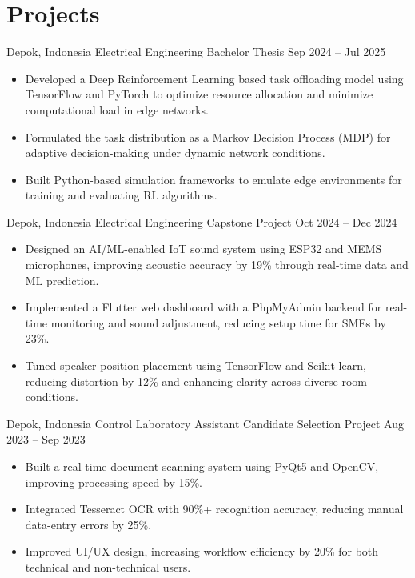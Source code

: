 \section*{Projects}

{Depok, Indonesia}
{Electrical Engineering Bachelor Thesis}
{Sep 2024 -- Jul 2025}
{
\begin{itemize}
    \itemsep0em
    \item Developed a Deep Reinforcement Learning based task offloading model using TensorFlow and PyTorch to optimize resource allocation and minimize computational load in edge networks.
    \item Formulated the task distribution as a Markov Decision Process (MDP) for adaptive decision-making under dynamic network conditions.
    \item Built Python-based simulation frameworks to emulate edge environments for training and evaluating RL algorithms.
\end{itemize}
}

{Depok, Indonesia}
{Electrical Engineering Capstone Project}
{Oct 2024 -- Dec 2024}
{
\begin{itemize}
    \itemsep0em
    \item Designed an AI/ML-enabled IoT sound system using ESP32 and MEMS microphones, improving acoustic accuracy by 19\% through real-time data and ML prediction.
    \item Implemented a Flutter web dashboard with a PhpMyAdmin backend for real-time monitoring and sound adjustment, reducing setup time for SMEs by 23\%.
    \item Tuned speaker position placement using TensorFlow and Scikit-learn, reducing distortion by 12\% and enhancing clarity across diverse room conditions.
\end{itemize}
}

{Depok, Indonesia}
{Control Laboratory Assistant Candidate Selection Project}
{Aug 2023 -- Sep 2023}
{
\begin{itemize}
    \itemsep0em
    \item Built a real-time document scanning system using PyQt5 and OpenCV, improving processing speed by 15\%.
    \item Integrated Tesseract OCR with 90\%+ recognition accuracy, reducing manual data-entry errors by 25\%.
    \item Improved UI/UX design, increasing workflow efficiency by 20\% for both technical and non-technical users.
\end{itemize}
}

